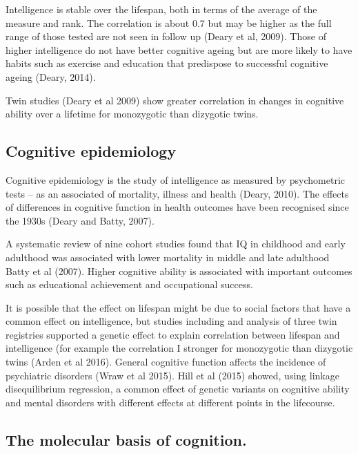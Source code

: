 Intelligence is stable over the lifespan, both in terms of the average of the measure and rank. The correlation is about 0.7 but may be higher as the full range of those tested are not seen in follow up \cite{deary2009genetic}(Deary et al, 2009). Those of higher intelligence do not have better cognitive ageing but are more likely to have habits such as exercise and education that predispose to successful cognitive ageing \cite{deary2014stability}(Deary, 2014). 

Twin studies (Deary et al 2009)\cite{deary2009genetic} show greater correlation in changes in cognitive ability over a lifetime for monozygotic than dizygotic twins.

\subsection{Cognitive epidemiology}

Cognitive epidemiology is the study of intelligence as measured by psychometric tests – as an associated of mortality, illness and health (Deary, 2010)\cite{deary2010cognitive}. The effects of differences in cognitive function in health outcomes have been recognised since the 1930s \cite{deary2007cognitive}(Deary and Batty, 2007).

A systematic review of nine cohort studies found that IQ in childhood and early adulthood was associated with lower mortality in middle and late adulthood Batty et al (2007).\cite{batty2007premorbid} Higher cognitive ability is associated with important outcomes such as educational achievement and occupational success.

It is possible that the effect on lifespan might be due to social factors that have a common effect on intelligence, but studies including and analysis of three twin registries supported a genetic effect to explain correlation between lifespan and intelligence (for example the correlation I stronger for monozygotic than dizygotic twins (Arden et al 2016).\cite{arden2016association} General cognitive function affects the incidence of psychiatric disorders (Wraw et al 2015).\cite{wraw2015intelligence} Hill et al (2015) showed, using linkage disequilibrium regression, a common effect of genetic variants on cognitive ability and mental disorders with different effects at different points in the lifecourse.\cite{hill2016age}

\subsection{The molecular basis of cognition.}

